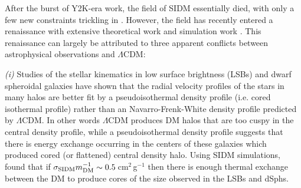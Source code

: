 After the burst of Y2K-era work, the field of SIDM essentially died, with only a few new constraints trickling in \citep{Randall:2008hs, Mahdavi:2007ed, Bradac:2008gw, Dawson:2012dl, Merten:2011gu}.
However, the field has recently entered a renaissance with extensive theoretical work \citep{ArkaniHamed:2009gk, Feng:2010kh, Tulin:2012jt, Tulin:2013eo, Ackerman:2009ia, Pospelov:2008di} and simulation work \citep{Peter:2012vi, Rocha:2012tr, Vogelsberger:2012dy, Vogelsberger:2013bb, Zavala:2013iq}.
This renaissance can largely be attributed to three apparent conflicts between astrophysical observations and $\Lambda$CDM:

{\it (i)} Studies of the stellar kinematics in low surface brightness (LSBs) and dwarf spheroidal galaxies \citep[dSphs;][]{Simon:2005fu, deNaray:2008iz, Oh:2011jd} have shown that the radial velocity profiles of the stars in many halos are better fit by a pseudoisothermal density profile (i.e. cored isothermal profile) rather than an Navarro-Frenk-White \citep[NFW;][]{Navarro:1996ce} density profile predicted by $\Lambda$CDM.
In other words $\Lambda$CDM produces DM halos that are too cuspy in the central density profile, while a pseudoisothermal density profile suggests that there is energy exchange occurring in the centers of these galaxies which produced cored (or flattened) central density halo.
Using SIDM simulations, \citet{Rocha:2012tr} found that if $\sigma_{\rm SIDM}m_{\rm DM}^{-1} \sim 0.5$\,cm$^2$\,g$^{-1}$ then there is enough thermal exchange between the DM to produce cores of the size observed in the LSBs and dSphs.

